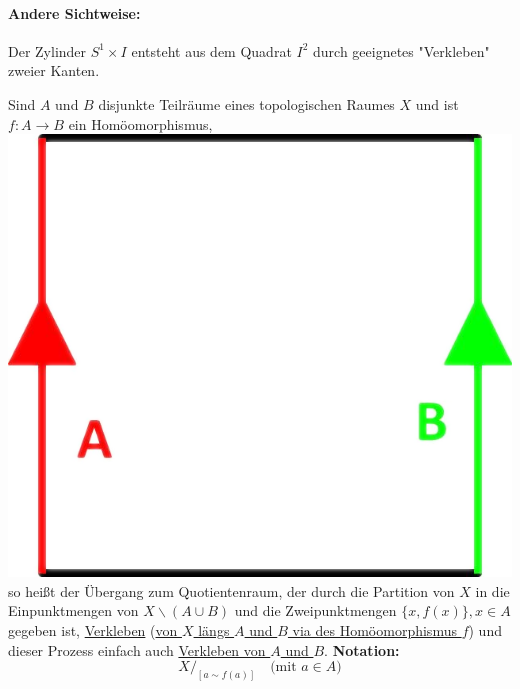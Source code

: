 \documentclass[a4paper,11pt,notitlepage]{report}
\theoremstyle{definition}
\newenvironment{definition}[1]{
	\begin{definitions}
	\marginnote{\emph{#1}}
}{\end{definitions}}
\begin{document}
\paragraph{Andere Sichtweise:}
Der Zylinder $S^1 \times I$ entsteht aus dem Quadrat $I^2$ durch geeignetes "Verkleben" zweier Kanten. 

\begin{definition}{Verkleben}
Sind $A$ und $B$ disjunkte Teilräume eines topologischen Raumes $X$ und ist $f \colon A \rightarrow B$ ein Homöomorphismus, \includegraphics[scale=0.2]{images/Def_Verkleben.png} so heißt der Übergang zum Quotientenraum, der durch die Partition von $X$ in die Einpunktmengen von $X \backslash (A \cup B)$ und die Zweipunktmengen $\{x,f(x)\}, x \in A$ gegeben ist, \underline{Verkleben} (\underline{von $X$ längs $A$ und $B$ via des Homöomorphismus $f$}) und dieser Prozess einfach auch \underline{Verkleben von $A$ und $B$}.
\newline
\textbf{Notation:}
$$X/_{[a \sim f(a)]} \quad \text{(mit $a \in A$)}$$
\end{definition}
\end{document}
